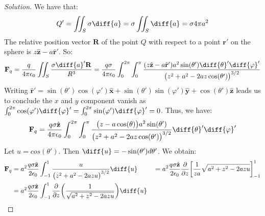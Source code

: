 \documentclass[crop=false,class=article,oneside]{standalone}
\begin{document}
    \begin{proof}[Solution]
        We have that:
        \begin{equation*}
            Q'=\iint_{S}\sigma\diff{a}
            =\sigma\iint_{S}\diff{a}
            =\sigma{4}\pi{a^{2}}
        \end{equation*}
        The relative position vector $\mathbf{R}$ of the point
        $Q$ with respect to a point $\mathbf{r}'$ on the sphere
        is $z\hat{\mathbf{z}}-a\hat{\mathbf{r}}'$. So:
        \begin{equation*}
            \mathbf{F}_{q}
            =\frac{q}{4\pi\epsilon_{0}}\iint_{S}
            \frac{\sigma\diff{a}'\mathbf{R}}{R^{3}}
            =\frac{q\sigma}{4\pi\epsilon_{0}}
            \int_{0}^{2\pi}\int_{0}^{\pi}
            \frac{(z\hat{\mathbf{z}}-a\hat{\mathbf{r}}')a^{2}
                  \sin(\theta')\diff{\theta}'\diff{\varphi}'}
                 {\big(z^2+a^2-2az\cos(\theta')\big)^{3/2}}
        \end{equation*}
        Writing
        $\hat{\mathbf{r}}'%
         =\sin(\theta')\cos(\varphi')\hat{\mathbf{x}}%
         +\sin(\theta')\sin(\varphi')\hat{\mathbf{y}}%
         +\cos(\theta')\hat{\mathbf{z}}$
        leads us to conclude the $x$ and $y$ component vanish as
        $\int_{0}^{2\pi}\cos(\varphi')\diff{\varphi}'%
         =\int_{0}^{2\pi}\sin(\varphi')\diff{\varphi}'%
         =0$.
        Thus, we have:
        \begin{equation*}
            \mathbf{F}_{q}
            =\frac{q\sigma\hat{\mathbf{z}}}{4\pi\epsilon_{0}}
            \int_{0}^{2\pi}\int_{0}^{\pi}
            \frac{\big(z-a\cos(\theta)\big)a^{2}
                  \sin(\theta')}
                 {\big(z^{2}+a^{2}-2az\cos(\theta')\big)^{3/2}}
            \diff{\theta}'\diff{\varphi}'
        \end{equation*}
        Let $u=cos(\theta')$.
        Then $\diff{u}=-\sin(\theta')d\theta'$. We obtain:
        \begin{align*}
            \mathbf{F}_{q}
            &=a^{2}\frac{q\sigma \hat{\mathbf{z}}}{2\epsilon_{0}}
            \int_{-1}^{1}\frac{u}{\big(z^{2}+a^{2}-2azu\big)^{3/2}}\diff{u}
            &
            &=a^{2}\frac{q\sigma \hat{\mathbf{z}}}{2\epsilon_{0}}
            \frac{\partial}{\partial z}
            \bigg[\frac{1}{za}\sqrt{a^{2}+z^{2}-2azu}\bigg]_{-1}^{1}\\
            &=a^{2}\frac{q\sigma\hat{\mathbf{z}}}{2\epsilon_{0}}
            \int_{-1}^{1}\frac{\partial}{\partial{z}}
            \bigg(\frac{1}{\sqrt{a^{2}+z^{2}-2azu}}\bigg)\diff{u}

\end{align*}
\end{proof}
\end{document}
